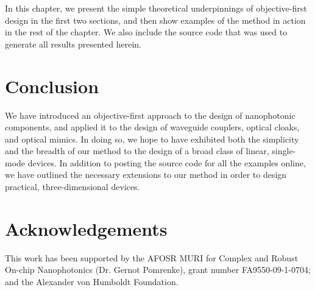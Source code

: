 In this chapter, we present the simple theoretical underpinnings of 
    objective-first design in the first two sections,
    and then show examples of the method in action in the rest of the chapter.
We also include the source code that was used to generate
    all results presented herein\cite{code}.
    








\section{Conclusion}
We have introduced an objective-first approach
    to the design of nanophotonic components, and
    applied it to the design of waveguide couplers,
    optical cloaks, and optical mimics.
In doing so, we hope to have exhibited both the simplicity
    and the breadth of our method to the design of a broad
    class of linear, single-mode devices.
In addition to posting the source code for all the examples online\cite{code}, 
    we have outlined the necessary extensions to our method in order
    to design practical, three-dimensional devices.

\section{Acknowledgements}
This work has been supported by the 
    AFOSR MURI for Complex and Robust On-chip Nanophotonics 
    (Dr. Gernot Pomrenke), grant number FA9550-09-1-0704; 
    and the Alexander von Humboldt Foundation.


